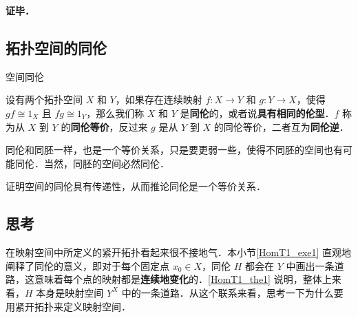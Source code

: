 \textbf{证毕．}

\subsection{拓扑空间的同伦}

\begin{definition}{空间同伦}

设有两个拓扑空间 $X$ 和 $Y$，如果存在连续映射 $f:X\rightarrow Y$ 和 $g:Y\rightarrow X$，使得 $gf\cong 1_X$ 且 $fg\cong 1_Y$，那么我们称 $X$ 和 $Y$ 是\textbf{同伦}的，或者说\textbf{具有相同的伦型}．$f$ 称为从 $X$ 到 $Y$ 的\textbf{同伦等价}，反过来 $g$ 是从 $Y$ 到 $X$ 的同伦等价，二者互为\textbf{同伦逆}．

\end{definition}

同伦和同胚一样，也是一个等价关系，只是要更弱一些，使得不同胚的空间也有可能同伦．当然，同胚的空间必然同伦．

\begin{exercise}{}
证明空间的同伦具有传递性，从而推论同伦是一个等价关系．
\end{exercise}

\subsection{思考}

在映射空间中所定义的紧开拓扑看起来很不接地气．本小节\autoref{HomT1_exe1} 直观地阐释了同伦的意义，即对于每个固定点 $x_0\in X$，同伦 $H$ 都会在 $Y$ 中画出一条道路，这意味着每个点的映射都是\textbf{连续地变化}的．\autoref{HomT1_the1} 说明，整体上来看，$H$ 本身是映射空间 $Y^X$ 中的一条道路．从这个联系来看，思考一下为什么要用紧开拓扑来定义映射空间．

